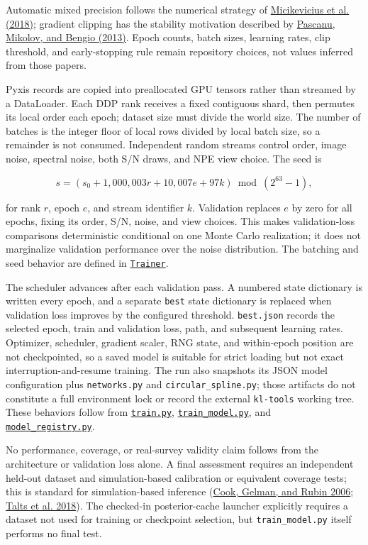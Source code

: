 \documentclass[11pt]{article}
\newcommand{\code}[1]{\nolinkurl{#1}}
\begin{document}
Automatic mixed precision follows the numerical strategy of \hyperlink{ref:micikevicius2018}{Micikevicius et al. (2018)}; gradient clipping has the stability motivation
described by \hyperlink{ref:pascanu2013}{Pascanu, Mikolov, and Bengio (2013)}. Epoch counts,
batch sizes, learning rates, clip threshold, and early-stopping rule remain
repository choices, not values inferred from those papers.

Pyxis records are copied into preallocated GPU tensors rather than streamed by
a DataLoader. Each DDP rank receives a fixed contiguous shard, then permutes
its local order each epoch; dataset size must divide the world size. The number
of batches is the integer floor of local rows divided by local batch size, so a
remainder is not consumed. Independent random streams control order, image
noise, spectral noise, both S/N draws, and NPE view choice. The seed is

\[
s=(s_0+1{,}000{,}003r+10{,}007e+97k)\bmod(2^{63}-1),
\]

for rank \(r\), epoch \(e\), and stream identifier \(k\). Validation replaces
\(e\) by zero for all epochs, fixing its order, S/N, noise, and view choices.
This makes validation-loss comparisons deterministic conditional on one Monte
Carlo realization; it does not marginalize validation performance over the
noise distribution. The batching and seed behavior are defined in
\href{../arch/train.py}{\code{Trainer}}.

The scheduler advances after each validation pass. A numbered state dictionary
is written every epoch, and a separate \code{best} state dictionary is replaced
when validation loss improves by the configured threshold. \code{best.json} records
the selected epoch, train and validation loss, path, and subsequent learning
rates. Optimizer, scheduler, gradient scaler, RNG state, and within-epoch
position are not checkpointed, so a saved model is suitable for strict loading
but not exact interruption-and-resume training. The run also snapshots its
JSON model configuration plus \code{networks.py} and \code{circular_spline.py}; those
artifacts do not constitute a full environment lock or record the external
\code{kl-tools} working tree. These behaviors follow from
\href{../arch/train.py}{\code{train.py}}, \href{../arch/train_model.py}{\code{train_model.py}}, and
\href{../arch/model_registry.py}{\code{model_registry.py}}.

No performance, coverage, or real-survey validity claim follows from the
architecture or validation loss alone. A final assessment requires an
independent held-out dataset and simulation-based calibration or equivalent
coverage tests; this is standard for simulation-based inference (\hyperlink{ref:cook2006}{Cook, Gelman, and Rubin 2006}; \hyperlink{ref:talts2018}{Talts et al. 2018}). The
checked-in posterior-cache launcher explicitly requires a dataset not used for
training or checkpoint selection, but \code{train_model.py} itself performs no
final test.
\end{document}
